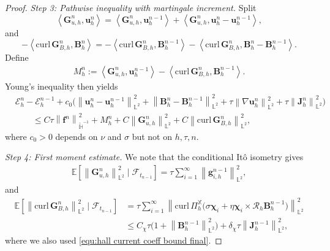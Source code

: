 \documentclass[10pt,a4paper]{amsart}
\newcommand{\bb}{\mathbb}
\newcommand{\bff}{\boldsymbol}
\newcommand{\curl}{\mathrm{curl}\,}
\newcommand{\inpro}[2]{\left\langle#1,#2\right\rangle}
\newcommand{\norm}[2]{\left\|{#1}\right\|_{#2}}
\begin{document}
\begin{proof}
	\emph{Step 3: Pathwise inequality with martingale increment.}
	Split
	\[
	\inpro{\bff G_{u,h}^n}{\bff u_h^n}
	=
	\inpro{\bff G_{u,h}^n}{\bff u_h^{n-1}}
	+
	\inpro{\bff G_{u,h}^n}{\bff u_h^n-\bff u_h^{n-1}},
	\]
	and
	\[
	-\inpro{\curl\bff G_{B,h}^n}{\bff B_h^n}
	=
	-\inpro{\curl\bff G_{B,h}^n}{\bff B_h^{n-1}}
	-
	\inpro{\curl\bff G_{B,h}^n}{\bff B_h^n-\bff B_h^{n-1}}.
	\]
	Define
	\begin{align}\label{equ:mart increment revised}
		M_h^n
		:=
		\inpro{\bff G_{u,h}^n}{\bff u_h^{n-1}}
		-
		\inpro{\curl\bff G_{B,h}^n}{\bff B_h^{n-1}}.
	\end{align}
	Young's inequality then yields
	\begin{align}\label{equ:pathwise inequality revised}
		&\mathcal E_h^n-\mathcal E_h^{n-1}
		+
		c_0\Big(
		\norm{\bff u_h^n-\bff u_h^{n-1}}{\bb L^2}^2
		+
		\norm{\bff B_h^n-\bff B_h^{n-1}}{\bb L^2}^2
		+
		\tau\norm{\nabla\bff u_h^n}{\bb L^2}^2
		+
		\tau\norm{\bff J_h^n}{\bb L^2}^2
		\Big)
		\nonumber\\
		&\qquad
		\le
		C\tau\norm{\bff f^n}{\widetilde{\bb H}^{-1}}^2
		+
		M_h^n
		+
		C\norm{\bff G_{u,h}^n}{\bb L^2}^2
		+
		C\norm{\curl\bff G_{B,h}^n}{\bb L^2}^2,
	\end{align}
	where $c_0>0$ depends on $\nu$ and $\sigma$ but not on $h,\tau,n$.
	
	\emph{Step 4: First moment estimate.}
	We note that the conditional It\^o isometry gives
	\begin{align}\label{equ:cond Ito u revised}
		\bb E\left[
		\norm{\bff G_{u,h}^n}{\bb L^2}^2\mid\mathscr F_{t_{n-1}}
		\right]
		=
		\tau\sum_{i=1}^{\infty}\norm{\bff g_{i,h}^{n-1}}{\bb L^2}^2,
	\end{align}
	and
	\begin{align}\label{equ:cond Ito B revised}
		\bb E\left[
		\norm{\curl\bff G_{B,h}^n}{\bb L^2}^2\mid\mathscr F_{t_{n-1}}
		\right]
		&=
		\tau\sum_{i=1}^{\infty}
		\norm{
			\curl\Pi_h^{\bb X}\bigl(\sigma\bff\chi_i+\eta\bff\chi_i\times\mathcal R_h\bff B_h^{n-1}\bigr)
		}{\bb L^2}^2
		\nonumber\\
		&\le
		C_\chi \tau \bigl(1+\norm{\bff{B}_h^{n-1}}{\bb{L}^2}^2\bigr)+\delta_\chi \tau \norm{\bff{J}_h^{n-1}}{\bb{L}^2}^2,
	\end{align}
	where we also used \eqref{equ:hall current coeff bound final}.
	

\end{proof}
\end{document}
